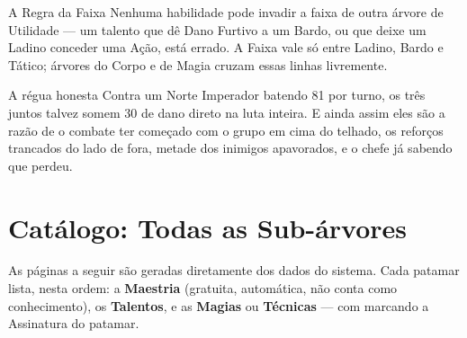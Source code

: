 \begin{aviso}{A Regra da Faixa}
    Nenhuma habilidade pode invadir a faixa de outra árvore de Utilidade --- um talento que dê
    Dano Furtivo a um Bardo, ou que deixe um Ladino conceder uma Ação, está errado. A Faixa
    vale só entre Ladino, Bardo e Tático; árvores do Corpo e de Magia cruzam essas linhas
    livremente.
\end{aviso}

\begin{nota}{A régua honesta}
    Contra um Norte Imperador batendo 81 por turno, os três juntos talvez somem 30 de dano
    direto na luta inteira. E ainda assim eles são a razão de o combate ter começado com o
    grupo em cima do telhado, os reforços trancados do lado de fora, metade dos inimigos
    apavorados, e o chefe já sabendo que perdeu.
\end{nota}

\chapter*{Catálogo: Todas as Sub-árvores}

As páginas a seguir são geradas diretamente dos dados do sistema. Cada patamar lista, nesta
ordem: a \simbmaestria{} \textbf{Maestria} (gratuita, automática, não conta como
conhecimento), os \textbf{Talentos}, e as \textbf{Magias} ou \textbf{Técnicas} --- com
\assinatura{} marcando a Assinatura do patamar.


